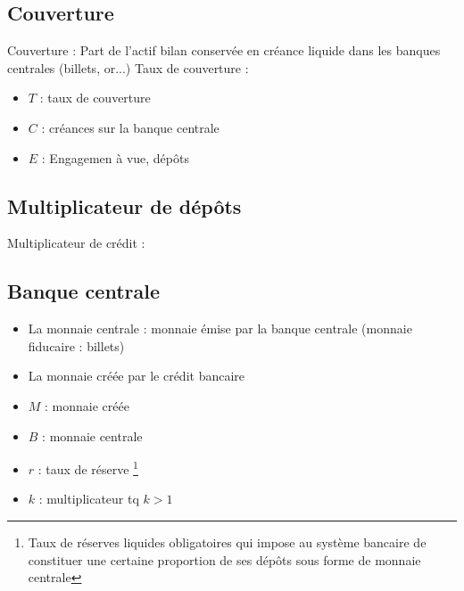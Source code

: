 \subsection{Couverture}
\textcolor{BrickRed}{Couverture} : Part de l'actif bilan conservée en créance liquide dans les banques centrales (billets, or...) \newline
\textcolor{BrickRed}{Taux de couverture} : 
\begin{center}
    \Large{}
\end{center}
\begin{itemize}
    \item $T$ : taux de couverture
    \item $C$ : créances sur la banque centrale
    \item $E$ : Engagemen à vue, dépôts 
\end{itemize}
\subsection{Multiplicateur de dépôts}
Multiplicateur de crédit :
\begin{center}
    \Large{}
\end{center}
\subsection{Banque centrale}

\begin{itemize}
    \item \textcolor{BrickRed}{La monnaie centrale} : monnaie émise par la banque centrale (monnaie fiducaire : billets)
    \item \textcolor{BrickRed}{La monnaie créée par le crédit bancaire}
    \begin{center}
        \Large{}
    \end{center}
\end{itemize}
\begin{itemize}
    \item $M$ : monnaie créée
    \item $B$ : monnaie centrale
    \item $r$ : taux de réserve \footnote{Taux de réserves liquides obligatoires qui impose au système bancaire de constituer une certaine proportion de ses dépôts sous forme de monnaie centrale}
    \item $k$ : multiplicateur tq $k > 1$
\end{itemize}
\newpage
